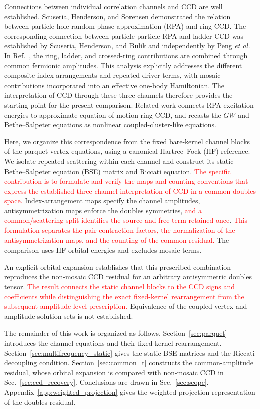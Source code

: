 \documentclass[aip,jcp,reprint,noshowkeys,superscriptaddress]{revtex4-1}
\newcommand{\titou}[1]{\textcolor{red}{#1}}
\begin{document}
Connections between individual correlation channels and CCD are well
established. Scuseria, Henderson, and Sorensen demonstrated the relation
between particle-hole random-phase approximation (RPA) and ring
CCD.\cite{Scuseria2008} The corresponding connection between particle-particle
RPA and ladder CCD was established by Scuseria, Henderson, and Bulik and
independently by Peng \textit{et al.}\cite{Scuseria2013,Peng2013}
In Ref.~, the ring,
ladder, and crossed-ring contributions are combined through common
fermionic amplitudes. This analysis explicitly addresses the different
composite-index arrangements and repeated driver terms, with mosaic
contributions incorporated into an effective one-body Hamiltonian.
The interpretation of CCD through these three channels therefore provides
the starting point for the present comparison. Related work connects RPA
excitation energies to approximate equation-of-motion ring
CCD,\cite{Berkelbach2018} and recasts the $GW$ and Bethe--Salpeter equations
as nonlinear coupled-cluster-like equations.\cite{Quintero2022}

Here, we organize this correspondence from the fixed bare-kernel channel
blocks of the parquet vertex equations, using a canonical Hartree--Fock (HF)
reference. We isolate repeated scattering within each channel and construct
its static Bethe--Salpeter equation (BSE) matrix and Riccati equation. \titou{The
specific contribution is to formulate and verify the maps and counting
conventions that express the established three-channel interpretation of
CCD in a common doubles space.} Index-arrangement maps specify the channel amplitudes,
antisymmetrization maps enforce the doubles symmetries, \titou{and a
common/scattering split identifies the source and free term retained once}.
\titou{This formulation separates the pair-contraction factors, the normalization
of the antisymmetrization maps, and the counting of the common residual.}
The comparison uses HF orbital energies and excludes mosaic terms.

An explicit orbital expansion establishes that this prescribed combination
reproduces the non-mosaic CCD residual for an arbitrary antisymmetric doubles
tensor. \titou{The result connects the static channel blocks to the CCD signs and
coefficients while distinguishing the exact fixed-kernel rearrangement from
the subsequent amplitude-level prescription.} Equivalence of the coupled
vertex and amplitude solution sets is not established.

The remainder of this work is organized as follows.
Section~\ref{sec:parquet} introduces the channel equations and their
fixed-kernel rearrangement. Section~\ref{sec:multifrequency_static} gives
the static BSE matrices and the Riccati decoupling condition.
Section~\ref{sec:common_t} constructs the common-amplitude residual, whose
orbital expansion is compared with non-mosaic CCD in
Sec.~\ref{sec:ccd_recovery}. Conclusions are drawn in Sec.~\ref{sec:scope}.
Appendix~\ref{app:weighted_projection} gives the weighted-projection
representation of the doubles residual.
\end{document}
